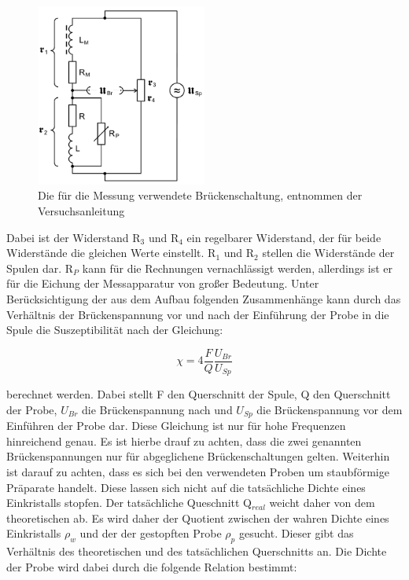 \begin{figure}
  \centering
  \includegraphics[width=0.5\textwidth]{images/Brueckenschaltung.png}
  \caption{Die für die Messung verwendete Brückenschaltung, entnommen der Versuchsanleitung\cite[179]{sample}}
  \label{fig:Brückenschaltung}
\end{figure}

Dabei ist der Widerstand R$_3$ und R$_4$ ein regelbarer Widerstand, der für beide Widerstände die gleichen Werte einstellt.
R$_1$ und R$_2$ stellen die Widerstände der Spulen dar.
R$_P$ kann für die Rechnungen vernachlässigt werden, allerdings ist er für die Eichung der Messapparatur von großer Bedeutung.
Unter Berücksichtigung der aus dem Aufbau folgenden Zusammenhänge  kann durch das Verhältnis der Brückenspannung vor und nach der Einführung der Probe in die Spule die Suszeptibilität nach der Gleichung:

\begin{equation}
  \chi = 4 \frac{F}{Q} \frac{U_{Br}}{U_{Sp}}
  \label{eqn:chi1}
\end{equation}

berechnet werden.
Dabei stellt F den Querschnitt der Spule, Q den Querschnitt der Probe, $U_{Br}$ die Brückenspannung nach und $U_{Sp}$ die Brückenspannung vor dem Einführen der Probe dar.
Diese Gleichung ist nur für hohe Frequenzen hinreichend genau.
Es ist hierbe drauf zu achten, dass die zwei genannten Brückenspannungen nur für abgeglichene Brückenschaltungen gelten.
Weiterhin ist darauf zu achten, dass es sich bei den verwendeten Proben um staubförmige Präparate handelt.
Diese lassen sich nicht auf die tatsächliche Dichte eines Einkristalls stopfen.
Der tatsächliche Queschnitt Q$_{real}$ weicht daher von dem theoretischen ab.
Es wird daher der Quotient zwischen der wahren Dichte eines Einkristalls $\rho_w$ und der der gestopften Probe $\rho_p$ gesucht.
Dieser gibt das Verhältnis des theoretischen und des tatsächlichen Querschnitts an.
Die Dichte der Probe wird dabei durch die folgende Relation bestimmt:

